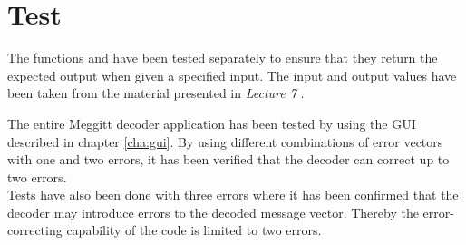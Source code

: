 \documentclass[Main]{subfiles}
\begin{document}
\chapter{Test}
\label{cha:test}
The functions  and  have been tested separately to ensure that they return the expected output when given a specified input. The input and output values have been taken from the material presented in \emph{Lecture 7} \cite{lec7}.

The entire Meggitt decoder application has been tested by using the GUI described in chapter \ref{cha:gui}. By using different combinations of error vectors with one and two errors, it has been verified that the decoder can correct up to two errors.
\\Tests have also been done with three errors where it has been confirmed that the decoder may introduce errors to the decoded message vector. Thereby the error-correcting capability of the code is limited to two errors.
\end{document}
